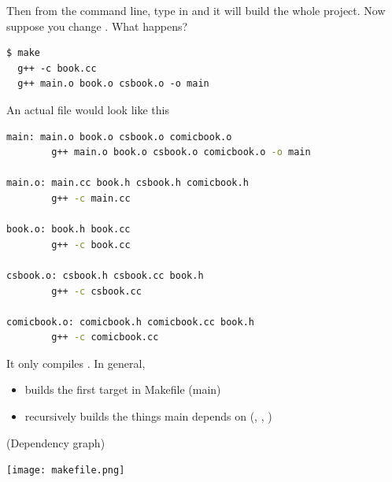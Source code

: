 \documentclass[english, 11pt]{article}
\begin{document}
Then from the command line, type in  and it will build the whole project. Now suppose you change . What happens?
\begin{lstlisting}
$ make
  g++ -c book.cc
  g++ main.o book.o csbook.o -o main
\end{lstlisting}
An actual file would look like this
\begin{lstlisting}[language=bash]
main: main.o book.o csbook.o comicbook.o
        g++ main.o book.o csbook.o comicbook.o -o main

main.o: main.cc book.h csbook.h comicbook.h
        g++ -c main.cc

book.o: book.h book.cc
        g++ -c book.cc

csbook.o: csbook.h csbook.cc book.h
        g++ -c csbook.cc

comicbook.o: comicbook.h comicbook.cc book.h
        g++ -c comicbook.cc
\end{lstlisting}
It only compiles . In general, 
\begin{itemize}
  \item builds the first target in Makefile (main)
  \item recursively builds the things main depends on (, , )
\end{itemize}
(Dependency graph)
\begin{center}
  \texttt{[image: makefile.png]}
\end{center}
\end{document}
